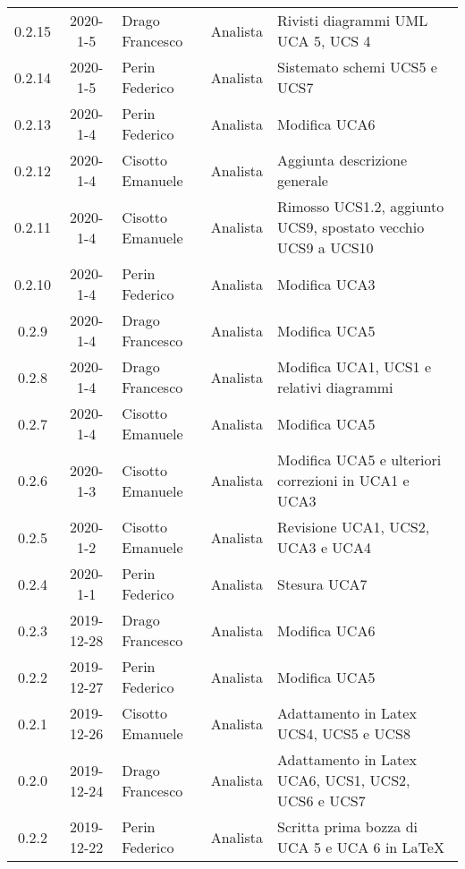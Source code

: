 {\begin{longtable}{ c c  C{4cm}  C{3cm} C{4cm}}
0.2.15 & 2020-1-5 & Drago Francesco & Analista & Rivisti diagrammi UML UCA 5, UCS 4 \\

0.2.14 & 2020-1-5 & Perin Federico & Analista & Sistemato schemi UCS5 e UCS7 \\

0.2.13 & 2020-1-4 & Perin Federico & Analista & Modifica UCA6 \\

0.2.12 & 2020-1-4 & Cisotto Emanuele & Analista & Aggiunta descrizione generale \\

0.2.11 & 2020-1-4 & Cisotto Emanuele & Analista & Rimosso UCS1.2, aggiunto UCS9, spostato vecchio UCS9 a UCS10 \\

0.2.10 & 2020-1-4 & Perin Federico & Analista & Modifica UCA3 \\

0.2.9 & 2020-1-4 & Drago Francesco & Analista & Modifica UCA5 \\

0.2.8 & 2020-1-4 & Drago Francesco & Analista & Modifica UCA1, UCS1 e relativi diagrammi \\

0.2.7 & 2020-1-4 & Cisotto Emanuele & Analista & Modifica UCA5 \\

0.2.6 & 2020-1-3 & Cisotto Emanuele & Analista & Modifica UCA5 e ulteriori correzioni in UCA1 e UCA3 \\

0.2.5 & 2020-1-2 & Cisotto Emanuele & Analista & Revisione UCA1, UCS2, UCA3 e UCA4 \\

0.2.4 & 2020-1-1 & Perin Federico & Analista & Stesura UCA7 \\

0.2.3 & 2019-12-28 & Drago Francesco & Analista & Modifica UCA6 \\

0.2.2 & 2019-12-27 & Perin Federico & Analista & Modifica UCA5 \\

0.2.1 & 2019-12-26 & Cisotto Emanuele & Analista & Adattamento in Latex UCS4, UCS5 e UCS8 \\

0.2.0 & 2019-12-24 & Drago Francesco & Analista & Adattamento in Latex UCA6, UCS1, UCS2, UCS6 e UCS7 \\

0.2.2 & 2019-12-22 & Perin Federico & Analista & Scritta prima bozza di UCA 5 e UCA 6 in LaTeX\\


\end{longtable}}
